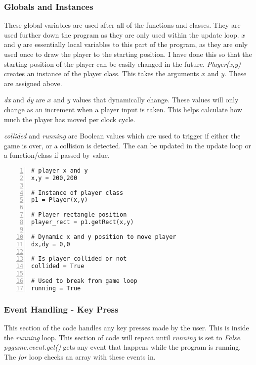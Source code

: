 \documentclass[12pt]{report}
\begin{document}
\subsubsection{Globals and Instances}
These global variables are used after all of the functions and classes. They are used further down the program as they are only used within the update loop. $x$ and $y$ are essentially local variables to this part of the program, as they are only used once to draw the player to the starting position. I have done this so that the starting position of the player can be easily changed in the future. \textit{Player(x,y)} creates an instance of the player class. This takes the arguments $x$ and $y$. These are assigned above. 

\textit{dx} and \textit{dy} are $x$ and $y$ values that dynamically change. These values will only change as an increment when a player input is taken. This helps calculate how much the player has moved per clock cycle. 

\textit{collided} and \textit{running} are Boolean values which are used to trigger if either the game is over, or a collision is detected. The can be updated in the update loop or a function/class if passed by value.

\large

\begin{Verbatim}[numbers=left, frame=single]
# player x and y
x,y = 200,200

# Instance of player class
p1 = Player(x,y)

# Player rectangle position
player_rect = p1.getRect(x,y)

# Dynamic x and y position to move player
dx,dy = 0,0

# Is player collided or not
collided = True

# Used to break from game loop
running = True
\end{Verbatim}

\normalsize

\pagebreak

\subsubsection{Event Handling - Key Press}
This section of the code handles any key presses made by the user. This is inside the \textit{running} loop. This section of code will repeat until \textit{running} is set to \textit{False}. \textit{pygame.event.get()} gets any event that happens while the program is running. The \textit{for} loop checks an array with these events in. 
\end{document}
